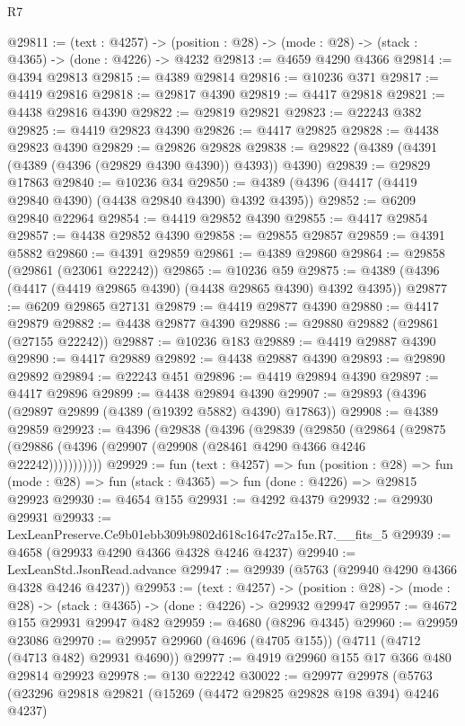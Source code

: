 \begin{lexlean}{R7}
\begin{coremodule}
@29811 := (text : @4257) ->
  (position : @28) -> (mode : @28) -> (stack : @4365) -> (done : @4226) -> @4232
@29813 := @4659 @4290 @4366
@29814 := @4394 @29813
@29815 := @4389 @29814
@29816 := @10236 @371
@29817 := @4419 @29816
@29818 := @29817 @4390
@29819 := @4417 @29818
@29821 := @4438 @29816 @4390
@29822 := @29819 @29821
@29823 := @22243 @382
@29825 := @4419 @29823 @4390
@29826 := @4417 @29825
@29828 := @4438 @29823 @4390
@29829 := @29826 @29828
@29838 := @29822 (@4389 (@4391 (@4389 (@4396 (@29829 @4390 @4390)) @4393)) @4390)
@29839 := @29829 @17863
@29840 := @10236 @34
@29850 := @4389 (@4396 (@4417 (@4419 @29840 @4390) (@4438 @29840 @4390) @4392 @4395))
@29852 := @6209 @29840 @22964
@29854 := @4419 @29852 @4390
@29855 := @4417 @29854
@29857 := @4438 @29852 @4390
@29858 := @29855 @29857
@29859 := @4391 @5882
@29860 := @4391 @29859
@29861 := @4389 @29860
@29864 := @29858 (@29861 (@23061 @22242))
@29865 := @10236 @59
@29875 := @4389 (@4396 (@4417 (@4419 @29865 @4390) (@4438 @29865 @4390) @4392 @4395))
@29877 := @6209 @29865 @27131
@29879 := @4419 @29877 @4390
@29880 := @4417 @29879
@29882 := @4438 @29877 @4390
@29886 := @29880 @29882 (@29861 (@27155 @22242))
@29887 := @10236 @183
@29889 := @4419 @29887 @4390
@29890 := @4417 @29889
@29892 := @4438 @29887 @4390
@29893 := @29890 @29892
@29894 := @22243 @451
@29896 := @4419 @29894 @4390
@29897 := @4417 @29896
@29899 := @4438 @29894 @4390
@29907 := @29893 (@4396 (@29897 @29899 (@4389 (@19392 @5882) @4390) @17863))
@29908 := @4389 @29859
@29923 := @4396
    (@29838
      (@4396
        (@29839
          (@29850
            (@29864
              (@29875 (@29886 (@4396 (@29907 (@29908 (@28461 @4290 @4366 @4246 @22242)))))))))))
@29929 := fun (text : @4257) =>
  fun (position : @28) =>
  fun (mode : @28) => fun (stack : @4365) => fun (done : @4226) => @29815 @29923
@29930 := @4654 @155
@29931 := @4292 @4379
@29932 := @29930 @29931
@29933 := LexLeanPreserve.Ce9b01ebb309b9802d618c1647c27a15e.R7.__fits_5
@29939 := @4658 (@29933 @4290 @4366 @4328 @4246 @4237)
@29940 := LexLeanStd.JsonRead.advance
@29947 := @29939 (@5763 (@29940 @4290 @4366 @4328 @4246 @4237))
@29953 := (text : @4257) ->
  (position : @28) -> (mode : @28) -> (stack : @4365) -> (done : @4226) -> @29932 @29947
@29957 := @4672 @155 @29931 @29947 @482
@29959 := @4680 (@8296 @4345)
@29960 := @29959 @23086
@29970 := @29957 @29960 (@4696 (@4705 @155)) (@4711 (@4712 (@4713 @482) @29931 @4690))
@29977 := @4919 @29960 @155 @17 @366 @480 @29814 @29923
@29978 := @130 @22242
@30022 := @29977
    @29978
    (@5763
      (@23296
        @29818
        @29821
        (@15269 (@4472 @29825 @29828 @198 @394) @4246 @4237)

\end{coremodule}
\end{lexlean}
